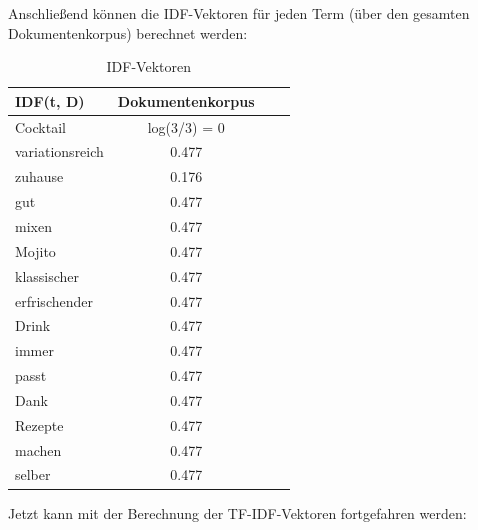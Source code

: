 \noindent
Anschließend können die \ac{IDF}-Vektoren für jeden Term (über den gesamten Dokumentenkorpus) berechnet werden:
\begin{table}[H]
    \centering
    \begin{tabular}{l|c|c|c}
        IDF(t, D)          & Dokumentenkorpus \\
        \hline
        Cocktail            & log(3/3) = 0  \\
        \hline
        variationsreich & 0.477   \\
        \hline
        zuhause                & 0.176  \\
        \hline
        gut                  & 0.477  \\
        \hline
        mixen            & 0.477  \\
        \hline
        Mojito & 0.477  \\
        \hline
        klassischer                & 0.477  \\
        \hline
        erfrischender                  & 0.477  \\
        \hline
        Drink            & 0.477  \\
        \hline
        immer & 0.477  \\
        \hline
        passt                & 0.477  \\
        \hline
        Dank                  & 0.477 \\
        \hline
        Rezepte            & 0.477 \\
        \hline
        machen & 0.477  \\
        \hline
        selber                & 0.477  \\
    \end{tabular}
    \caption{\label{table:IDF_Vektoren}IDF-Vektoren}
\end{table}
\noindent
Jetzt kann mit der Berechnung der \ac{TF-IDF}-Vektoren fortgefahren werden:
